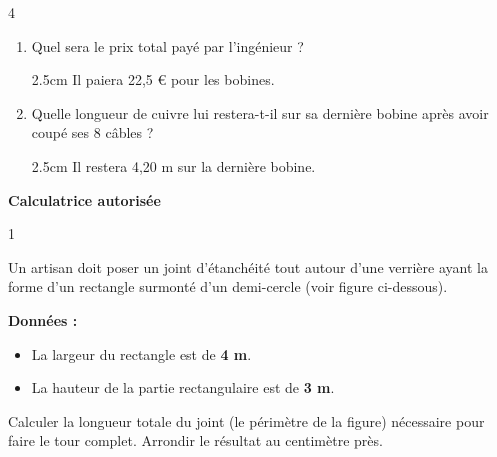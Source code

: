 \documentclass[a4paper]{book}
\begin{document}
{\begin{exerciceNote}{4}
\begin{enumerate}[leftmargin=*]
\begin{enumerate}[leftmargin=*]
                \item Quel sera le prix total payé par l'ingénieur ?

                \begin{ZoneReponse}{2.5cm}
                     \hspace{2cm} Il paiera 22,5 € pour les bobines.
                \end{ZoneReponse}
                
                \item Quelle longueur de cuivre lui restera-t-il sur sa dernière bobine après avoir coupé ses 8 câbles ?

                \begin{ZoneReponse}{2.5cm}
                     \hspace{2cm} Il restera 4,20 m sur la dernière bobine.
                \end{ZoneReponse}
            \end{enumerate}
        \end{enumerate}
    \end{exerciceNote}

\newpage

\raggedright
\NomPrenom  \hfill \textbf{Calculatrice autorisée}


    \begin{exerciceNote}{1}
        \begin{minipage}{0.6\linewidth}
            Un artisan doit poser un joint d'étanchéité tout autour d'une verrière ayant la forme d'un rectangle surmonté d'un demi-cercle (voir figure ci-dessous).
        
            \textbf{Données :}
            \begin{itemize}
                \item La largeur du rectangle est de \textbf{4 m}.
                \item La hauteur de la partie rectangulaire est de \textbf{3 m}.
            \end{itemize}
        
            Calculer la longueur totale du joint (le périmètre de la figure) nécessaire pour faire le tour complet. Arrondir le résultat au centimètre près.


\end{minipage}
\end{exerciceNote}}
\end{document}
